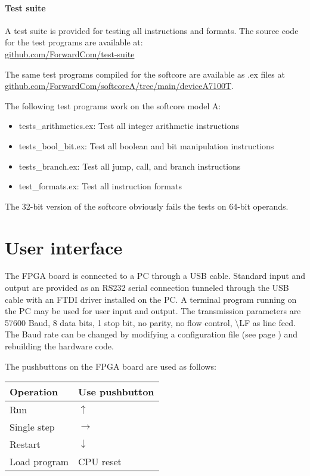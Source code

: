 \documentclass[11pt,a4paper,oneside,openright]{report}
\newcommand{\vv}{ \vspace{2mm} }   %
\begin{document}
\subsubsection{Test suite}
A test suite is provided for testing all instructions and formats. The source code for the test programs are available at:\\

\href{https://github.com/ForwardCom/test-suite}{github.com/ForwardCom/test-suite}
\vv

The same test programs compiled for the softcore are available as .ex files at \\
\href{https://github.com/ForwardCom/softcoreA/tree/main/deviceA7100T}{github.com/ForwardCom/softcoreA/tree/main/deviceA7100T}.
\vv

The following test programs work on the softcore model A:
\begin{itemize}
\item tests\_arithmetics.ex: Test all integer arithmetic instructions
\item tests\_bool\_bit.ex: Test all boolean and bit manipulation instructions
\item tests\_branch.ex: Test all jump, call, and branch instructions
\item test\_formats.ex: Test all instruction formats
\end{itemize}
\vv

The 32-bit version of the softcore obviously fails the tests on 64-bit operands.
\vv


\chapter{User interface}
The FPGA board is connected to a PC through a USB cable. Standard input and output are provided as an RS232 serial connection tunneled through the USB cable with an FTDI driver installed on the PC. A terminal program running on the PC may be used for user input and output. The transmission parameters are 57600 Baud, 8 data bits, 1 stop bit, no parity, no flow control, 
\textbackslash{LF} as line feed. The Baud rate can be changed by modifying a configuration file (see page \pageref{SettingConfiguration}) and rebuilding the hardware code.
\vv

The pushbuttons on the FPGA board are used as follows:
\vv

\begin{tabular}{|l|l|} 
\hline
\bfseries Operation  & \bfseries Use pushbutton  \\ \hline
Run  &  $\uparrow$  \\ \hline
Single step  &  $\rightarrow$  \\ \hline
Restart  &  $\downarrow$  \\ \hline
Load program  &  CPU reset  \\ \hline
\end{tabular}
\vv
\end{document}
